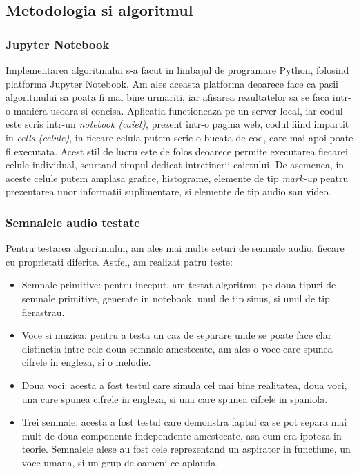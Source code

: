 \documentclass[12pt]{article}
\begin{document}
\subsection{Metodologia si algoritmul}
\subsubsection{Jupyter Notebook}
Implementarea algoritmului s-a facut in limbajul de programare Python, folosind platforma Jupyter Notebook. Am ales aceasta platforma deoarece face ca pasii algoritmului sa poata fi mai bine urmariti, iar afisarea rezultatelor sa se faca intr-o maniera usoara si concisa. Aplicatia functioneaza pe un server local, iar codul este scris intr-un \textit{notebook (caiet)}, prezent intr-o pagina web, codul fiind impartit in \textit{cells (celule)}, in fiecare celula putem scrie o bucata de cod, care mai apoi poate fi executata. Acest stil de lucru este de folos deoarece permite executarea fiecarei celule individual, scurtand timpul dedicat intretinerii caietului. De asemenea, in aceste celule putem amplasa grafice, histograme, elemente de tip \textit{mark-up} pentru prezentarea unor informatii suplimentare, si elemente de tip audio sau video. 
\newpage
\subsubsection{Semnalele audio testate}
Pentru testarea algoritmului, am ales mai multe seturi de semnale audio, fiecare cu proprietati diferite. Astfel, am realizat patru teste:
\begin{itemize}
	\item{Semnale primitive: pentru inceput, am testat algoritmul pe doua tipuri de semnale primitive, generate in notebook, unul de tip sinus, si unul de tip fierastrau.}
	\item{Voce si muzica: pentru a testa un caz de separare unde se poate face clar distinctia intre cele doua semnale amestecate, am ales o voce care spunea cifrele in engleza, si o melodie.}
	\item{Doua voci: acesta a fost testul care simula cel mai bine realitatea, doua voci, una care spunea cifrele in engleza, si una care spunea cifrele in spaniola.}
	\item{Trei semnale: acesta a fost testul care demonstra faptul ca se pot separa mai mult de doua componente independente amestecate, asa cum era ipoteza in teorie. Semnalele alese au fost cele reprezentand un aspirator in functiune, un voce umana, si un grup de oameni ce aplauda.}
\end{itemize}
\end{document}
